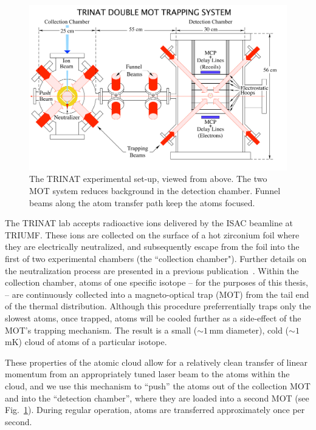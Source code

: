 \begin{figure}[t!h]
	\centering
	\includegraphics[width=.999\linewidth]
	{Figures/doublemot4.pdf}
	\caption{The TRINAT experimental set-up, viewed from above.  The two MOT system reduces background in the detection chamber.  Funnel beams along the atom transfer path keep the atoms focused.}	
	\label{fig:doublemot}
\end{figure}

The TRINAT lab accepts radioactive ions delivered by the ISAC beamline at TRIUMF.  These ions are collected on the surface of a hot zirconium foil where they are electrically neutralized, and subsequently escape from the foil into the first of two experimental chambers (the ``collection chamber").  Further details on the neutralization process are presented in a previous publication~\cite{gorelov2000}.  Within the collection chamber, atoms of one specific isotope -- for the purposes of this thesis,   -- are continuously collected into a magneto-optical trap (MOT) from the tail end of the thermal distribution.  Although this procedure preferrentially traps only the slowest atoms, once trapped, atoms will be cooled further as a side-effect of the MOT's trapping mechanism.  The result is a small ($\sim\!1\,$mm diameter), cold ($\sim\!1\,$mK) cloud of atoms of a particular isotope.  

These properties of the atomic cloud allow for a relatively clean transfer of linear momentum from an appropriately tuned laser beam to the atoms within the cloud, and we use this mechanism to ``push'' the atoms out of the collection MOT and into the ``detection chamber'', where they are loaded into a second MOT (see Fig.~\ref{fig:doublemot}).  During regular operation, atoms are transferred approximately once per second.  

